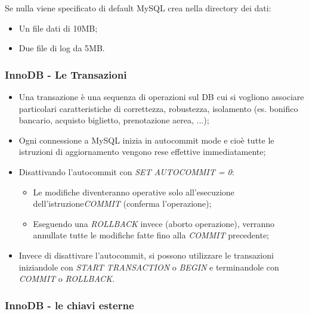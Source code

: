 Se nulla viene specificato di default MySQL crea nella directory dei dati:

\begin{itemize}

\item Un file dati di 10MB;
\item Due file di log da 5MB.

\end{itemize}

\subsubsection{InnoDB - Le Transazioni}

\begin{itemize}

\item Una transazione è una sequenza di operazioni sul DB cui si vogliono associare particolari caratteristiche di correttezza, robustezza, isolamento (es. bonifico bancario, acquisto biglietto, prenotazione aerea, ...);
\item Ogni connessione a MySQL inizia in autocommit mode e cioè tutte le istruzioni di aggiornamento vengono rese effettive immediatamente;
\item Disattivando l’autocommit con \textit{SET AUTOCOMMIT = 0}:

\begin{itemize}

\item Le modifiche diventeranno operative solo all’esecuzione dell’istruzione\newline \textit{COMMIT} (conferma l’operazione);
\item Eseguendo una \textit{ROLLBACK} invece (aborto operazione), verranno annullate tutte le modifiche fatte fino alla \textit{COMMIT} precedente;
\end{itemize}

\item Invece di disattivare l’autocommit, si possono utilizzare le transazioni iniziandole con \textit{START TRANSACTION} o \textit{BEGIN} e terminandole con \textit{COMMIT} o \textit{ROLLBACK}.

\end{itemize}

\subsubsection{InnoDB - le chiavi esterne}

